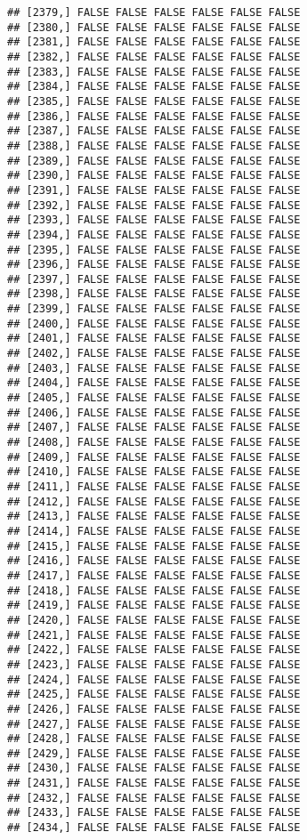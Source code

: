 \documentclass[
]{article}
\begin{document}
\begin{verbatim}
## [2379,] FALSE FALSE FALSE FALSE FALSE FALSE
## [2380,] FALSE FALSE FALSE FALSE FALSE FALSE
## [2381,] FALSE FALSE FALSE FALSE FALSE FALSE
## [2382,] FALSE FALSE FALSE FALSE FALSE FALSE
## [2383,] FALSE FALSE FALSE FALSE FALSE FALSE
## [2384,] FALSE FALSE FALSE FALSE FALSE FALSE
## [2385,] FALSE FALSE FALSE FALSE FALSE FALSE
## [2386,] FALSE FALSE FALSE FALSE FALSE FALSE
## [2387,] FALSE FALSE FALSE FALSE FALSE FALSE
## [2388,] FALSE FALSE FALSE FALSE FALSE FALSE
## [2389,] FALSE FALSE FALSE FALSE FALSE FALSE
## [2390,] FALSE FALSE FALSE FALSE FALSE FALSE
## [2391,] FALSE FALSE FALSE FALSE FALSE FALSE
## [2392,] FALSE FALSE FALSE FALSE FALSE FALSE
## [2393,] FALSE FALSE FALSE FALSE FALSE FALSE
## [2394,] FALSE FALSE FALSE FALSE FALSE FALSE
## [2395,] FALSE FALSE FALSE FALSE FALSE FALSE
## [2396,] FALSE FALSE FALSE FALSE FALSE FALSE
## [2397,] FALSE FALSE FALSE FALSE FALSE FALSE
## [2398,] FALSE FALSE FALSE FALSE FALSE FALSE
## [2399,] FALSE FALSE FALSE FALSE FALSE FALSE
## [2400,] FALSE FALSE FALSE FALSE FALSE FALSE
## [2401,] FALSE FALSE FALSE FALSE FALSE FALSE
## [2402,] FALSE FALSE FALSE FALSE FALSE FALSE
## [2403,] FALSE FALSE FALSE FALSE FALSE FALSE
## [2404,] FALSE FALSE FALSE FALSE FALSE FALSE
## [2405,] FALSE FALSE FALSE FALSE FALSE FALSE
## [2406,] FALSE FALSE FALSE FALSE FALSE FALSE
## [2407,] FALSE FALSE FALSE FALSE FALSE FALSE
## [2408,] FALSE FALSE FALSE FALSE FALSE FALSE
## [2409,] FALSE FALSE FALSE FALSE FALSE FALSE
## [2410,] FALSE FALSE FALSE FALSE FALSE FALSE
## [2411,] FALSE FALSE FALSE FALSE FALSE FALSE
## [2412,] FALSE FALSE FALSE FALSE FALSE FALSE
## [2413,] FALSE FALSE FALSE FALSE FALSE FALSE
## [2414,] FALSE FALSE FALSE FALSE FALSE FALSE
## [2415,] FALSE FALSE FALSE FALSE FALSE FALSE
## [2416,] FALSE FALSE FALSE FALSE FALSE FALSE
## [2417,] FALSE FALSE FALSE FALSE FALSE FALSE
## [2418,] FALSE FALSE FALSE FALSE FALSE FALSE
## [2419,] FALSE FALSE FALSE FALSE FALSE FALSE
## [2420,] FALSE FALSE FALSE FALSE FALSE FALSE
## [2421,] FALSE FALSE FALSE FALSE FALSE FALSE
## [2422,] FALSE FALSE FALSE FALSE FALSE FALSE
## [2423,] FALSE FALSE FALSE FALSE FALSE FALSE
## [2424,] FALSE FALSE FALSE FALSE FALSE FALSE
## [2425,] FALSE FALSE FALSE FALSE FALSE FALSE
## [2426,] FALSE FALSE FALSE FALSE FALSE FALSE
## [2427,] FALSE FALSE FALSE FALSE FALSE FALSE
## [2428,] FALSE FALSE FALSE FALSE FALSE FALSE
## [2429,] FALSE FALSE FALSE FALSE FALSE FALSE
## [2430,] FALSE FALSE FALSE FALSE FALSE FALSE
## [2431,] FALSE FALSE FALSE FALSE FALSE FALSE
## [2432,] FALSE FALSE FALSE FALSE FALSE FALSE
## [2433,] FALSE FALSE FALSE FALSE FALSE FALSE
## [2434,] FALSE FALSE FALSE FALSE FALSE FALSE

\end{verbatim}
\end{document}

